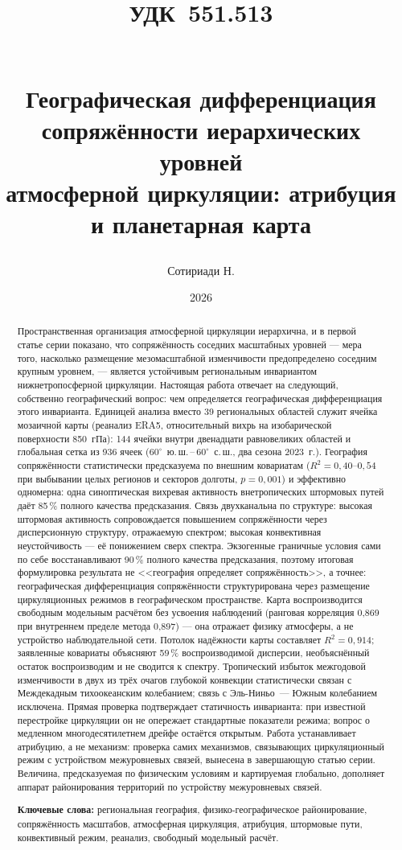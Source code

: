 \documentclass[11pt,a4paper]{article}
\title{{\normalsize\normalfont\hspace*{-\leftskip}\parbox{\linewidth}{\raggedright УДК~551.513}}\\[1.5em]
Географическая дифференциация сопряжённости иерархических уровней\\
атмосферной циркуляции: атрибуция и планетарная карта}
\author{Сотириади Н.}
\date{2026}
\begin{document}
\maketitle

\begin{abstract}
Пространственная организация атмосферной циркуляции иерархична, и в первой статье серии показано, что сопряжённость соседних масштабных уровней --- мера того, насколько размещение мезомасштабной изменчивости предопределено соседним крупным уровнем, --- является устойчивым региональным инвариантом нижнетропосферной циркуляции. Настоящая работа отвечает на следующий, собственно географический вопрос: чем определяется географическая дифференциация этого инварианта. Единицей анализа вместо 39 региональных областей служит ячейка мозаичной карты (реанализ ERA5, относительный вихрь на изобарической поверхности 850~гПа): 144 ячейки внутри двенадцати равновеликих областей и глобальная сетка из 936 ячеек ($60^\circ$~ю.\,ш.\,--\,$60^\circ$~с.\,ш., два сезона 2023~г.). География сопряжённости статистически предсказуема по внешним ковариатам ($R^2=0{,}40$--$0{,}54$ при выбывании целых регионов и секторов долготы, $p=0{,}001$) и эффективно одномерна: одна синоптическая вихревая активность внетропических штормовых путей даёт 85\,\% полного качества предсказания. Связь двухканальна по структуре: высокая штормовая активность сопровождается повышением сопряжённости через дисперсионную структуру, отражаемую спектром; высокая конвективная неустойчивость --- её понижением сверх спектра. Экзогенные граничные условия сами по себе восстанавливают 90\,\% полного качества предсказания, поэтому итоговая формулировка результата не <<география определяет сопряжённость>>, а точнее: географическая дифференциация сопряжённости структурирована через размещение циркуляционных режимов в географическом пространстве. Карта воспроизводится свободным модельным расчётом без усвоения наблюдений (ранговая корреляция 0,869 при внутреннем пределе метода 0,897) --- она отражает физику атмосферы, а не устройство наблюдательной сети. Потолок надёжности карты составляет $R^2=0{,}914$; заявленные ковариаты объясняют 59\,\% воспроизводимой дисперсии, необъяснённый остаток воспроизводим и не сводится к спектру. Тропический избыток межгодовой изменчивости в двух из трёх очагов глубокой конвекции статистически связан с Междекадным тихоокеанским колебанием; связь с Эль-Ниньо~--- Южным колебанием исключена. Прямая проверка подтверждает статичность инварианта: при известной перестройке циркуляции он не опережает стандартные показатели режима; вопрос о медленном многодесятилетнем дрейфе остаётся открытым. Работа устанавливает атрибуцию, а не механизм: проверка самих механизмов, связывающих циркуляционный режим с устройством межуровневых связей, вынесена в завершающую статью серии. Величина, предсказуемая по физическим условиям и картируемая глобально, дополняет аппарат районирования территорий по устройству межуровневых связей.

\smallskip
\noindent\textbf{Ключевые слова:} региональная география, физико-географическое районирование, сопряжённость масштабов, атмосферная циркуляция, атрибуция, штормовые пути, конвективный режим, реанализ, свободный модельный расчёт.
\end{abstract}
\end{document}
